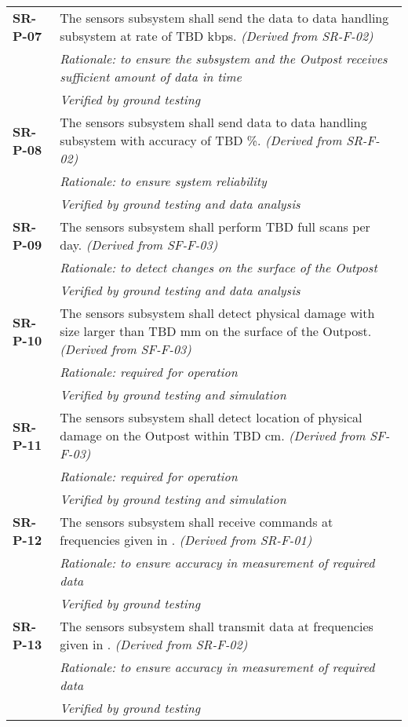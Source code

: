 \begin{longtable}{P{2cm}P{13.25cm}}
\textbf{SR-P-07}	& The sensors subsystem shall send the data to data handling subsystem at rate of \gls{TBD} \gls{kbps}. \textit{(Derived from SR-F-02)} \\
 & \textit{Rationale: to ensure the subsystem and the Outpost receives sufficient amount of data in time} \\
  & \textit{Verified by ground testing}		\\
  
\textbf{SR-P-08}	& The sensors subsystem shall send data to data handling subsystem with accuracy of \gls{TBD} \%. \textit{(Derived from SR-F-02)} \\
 & \textit{Rationale: to ensure system reliability} \\
 & \textit{Verified by ground testing and data analysis}	\\
 
\textbf{SR-P-09}	& The sensors subsystem shall perform \gls{TBD} full scans per day. \textit{(Derived from SF-F-03)} \\
 & \textit{Rationale: to detect changes on the surface of the Outpost} \\
 & \textit{Verified by ground testing and data analysis}			\\
 
\textbf{SR-P-10}	& The sensors subsystem shall detect physical damage with size larger than \gls{TBD} \gls{mm} on the surface of the Outpost. \textit{(Derived from SF-F-03)} \\
 & \textit{Rationale: required for operation} \\
 & \textit{Verified by ground testing and simulation}	\\
 
\textbf{SR-P-11}	& The sensors subsystem shall detect location of physical damage on the Outpost within \gls{TBD} \gls{cm}. \textit{(Derived from SF-F-03)} \\
 & \textit{Rationale: required for operation} \\
 & \textit{Verified by ground testing and simulation}	\\
 
\textbf{SR-P-12}	& The sensors subsystem shall receive commands at frequencies given in . \textit{(Derived from SR-F-01)} \\
 & \textit{Rationale: to ensure accuracy in measurement of required data} \\
 & \textit{Verified by ground testing}	\\
 
\textbf{SR-P-13}	& The sensors subsystem shall transmit data at frequencies given in . \textit{(Derived from SR-F-02)} \\
 & \textit{Rationale: to ensure accuracy in measurement of required data} \\
 & \textit{Verified by ground testing}	
\end{longtable}

